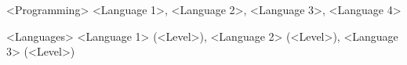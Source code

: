 
\begin{cvskills}
	
	\cvskill
	{<Programming>}
	{<Language 1>, <Language 2>, <Language 3>, <Language 4>}
	
	\cvskill
	{<Languages>}
	{<Language 1> (<Level>), <Language 2> (<Level>), <Language 3> (<Level>)} 
	
\end{cvskills}
